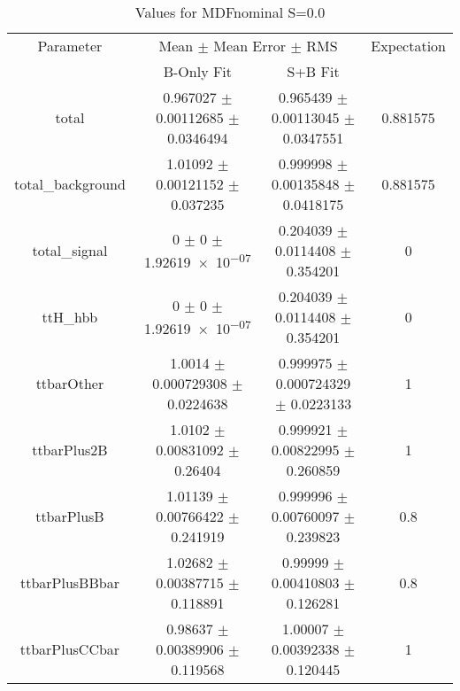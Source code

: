 \begin{table}
\centering
\caption{Values for MDFnominal S=0.0}
\begin{tabular}{cccc}
\toprule
Parameter & \multicolumn{2}{c}{Mean $\pm$ Mean Error $\pm$ RMS} & Expectation\\
 & B-Only Fit & S+B Fit & \\
\midrule
total & \num{0.967027} $\pm$ \num{0.00112685} $\pm$ \num{0.0346494} & \num{0.965439} $\pm$ \num{0.00113045} $\pm$ \num{0.0347551} & \num{0.881575}\\
total\_background & \num{1.01092} $\pm$ \num{0.00121152} $\pm$ \num{0.037235} & \num{0.999998} $\pm$ \num{0.00135848} $\pm$ \num{0.0418175} & \num{0.881575}\\
total\_signal & \num{0} $\pm$ \num{0} $\pm$ \num{1.92619e-07} & \num{0.204039} $\pm$ \num{0.0114408} $\pm$ \num{0.354201} & \num{0}\\
ttH\_hbb & \num{0} $\pm$ \num{0} $\pm$ \num{1.92619e-07} & \num{0.204039} $\pm$ \num{0.0114408} $\pm$ \num{0.354201} & \num{0}\\
ttbarOther & \num{1.0014} $\pm$ \num{0.000729308} $\pm$ \num{0.0224638} & \num{0.999975} $\pm$ \num{0.000724329} $\pm$ \num{0.0223133} & \num{1}\\
ttbarPlus2B & \num{1.0102} $\pm$ \num{0.00831092} $\pm$ \num{0.26404} & \num{0.999921} $\pm$ \num{0.00822995} $\pm$ \num{0.260859} & \num{1}\\
ttbarPlusB & \num{1.01139} $\pm$ \num{0.00766422} $\pm$ \num{0.241919} & \num{0.999996} $\pm$ \num{0.00760097} $\pm$ \num{0.239823} & \num{0.8}\\
ttbarPlusBBbar & \num{1.02682} $\pm$ \num{0.00387715} $\pm$ \num{0.118891} & \num{0.99999} $\pm$ \num{0.00410803} $\pm$ \num{0.126281} & \num{0.8}\\
ttbarPlusCCbar & \num{0.98637} $\pm$ \num{0.00389906} $\pm$ \num{0.119568} & \num{1.00007} $\pm$ \num{0.00392338} $\pm$ \num{0.120445} & \num{1}\\
\bottomrule
\end{tabular}
\end{table}